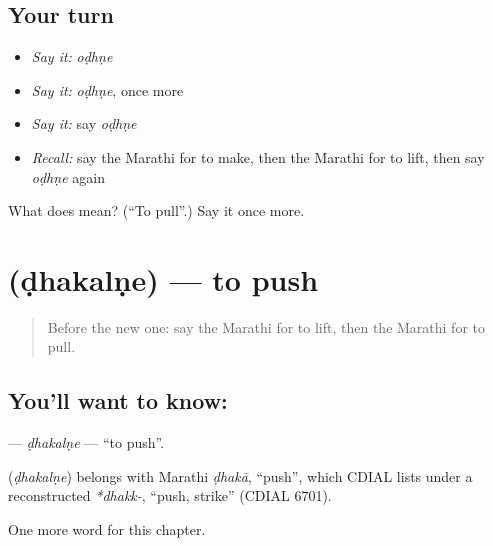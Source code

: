 \subsection*{Your turn}
\begin{itemize}
\raggedright
  \item \emph{Say it:} \emph{oḍhṇe}
  \item \emph{Say it:} \emph{oḍhṇe}, once more
  \item \emph{Say it:} say \emph{oḍhṇe}
  \item \emph{Recall:} say the Marathi for to make, then the Marathi for to lift, then say \emph{oḍhṇe} again
\end{itemize}

\begin{tcolorbox}[breakable,colback=teal!4,colframe=teal!35!black,title={Before you move on}]
What does  mean? (\textquotedblleft{}To pull\textquotedblright{}.) Say it once more.
\end{tcolorbox}
\section[\texorpdfstring{\mr{ढकलणे} (ḍhakalṇe)}{ढकलणे (ḍhakalṇe)}]{ (ḍhakalṇe) — to push}

\label{lesson:MR-C83-dhakalne}



\begin{quote}
Before the new one: say the Marathi for to lift, then the Marathi for to pull.
\end{quote}

\subsection*{You'll want to know: }
\textbf{} — \emph{ḍhakalṇe} — \textquotedblleft{}to push\textquotedblright{}.

\begin{cousinweb}
\textbf{} (\emph{ḍhakalṇe}) belongs with Marathi \emph{ḍhakā}, \textquotedblleft{}push\textquotedblright{}, which CDIAL lists under a reconstructed \emph{*dhakk-}, \textquotedblleft{}push, strike\textquotedblright{} (CDIAL 6701).
\end{cousinweb}

\begin{grammarlens}[title={What you've built}]
One more word for this chapter.
\end{grammarlens}

